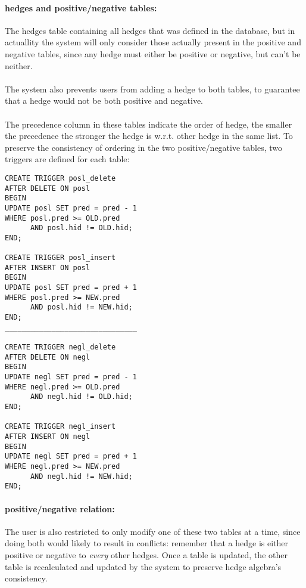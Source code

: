 \documentclass[../gr-final.tex]{subfiles}
\begin{document}
\paragraph{hedges and positive/negative tables:}
The hedges table containing all hedges that was defined in the database, but
in actuallity the system will only consider those actually present in
the positive and negative tables, since any hedge must either be
positive or negative, but can't be neither.
\paragraph{} The system also prevents users from adding a hedge to both tables, to
guarantee that a hedge would not be both positive and negative.
\paragraph{} The precedence column in these tables indicate the order of hedge, the
smaller the precedence the stronger the hedge is w.r.t. other hedge in
the same list. To preserve the consistency of ordering in the two
positive/negative tables, two triggers are defined for each
table:\\
\begin{lstlisting}
CREATE TRIGGER posl_delete  
AFTER DELETE ON posl  
BEGIN
UPDATE posl SET pred = pred - 1          
WHERE posl.pred >= OLD.pred 
      AND posl.hid != OLD.hid;
END;

CREATE TRIGGER posl_insert   
AFTER INSERT ON posl   
BEGIN
UPDATE posl SET pred = pred + 1
WHERE posl.pred >= NEW.pred 
      AND posl.hid != NEW.hid;  
END;
_______________________________

CREATE TRIGGER negl_delete  
AFTER DELETE ON negl  
BEGIN
UPDATE negl SET pred = pred - 1
WHERE negl.pred >= OLD.pred 
      AND negl.hid != OLD.hid;  
END;

CREATE TRIGGER negl_insert   
AFTER INSERT ON negl   
BEGIN
UPDATE negl SET pred = pred + 1        
WHERE negl.pred >= NEW.pred 
      AND negl.hid != NEW.hid;  
END;
\end{lstlisting}

\paragraph{positive/negative relation:}
The user is also restricted to only modify one of these two tables at
a time, since doing both would likely to result in conflicts: remember
that a hedge is either positive or negative to {\em every} other
hedges. 
Once a table is updated, the other table is recalculated and updated
by the system to preserve hedge algebra's consistency.
\end{document}
